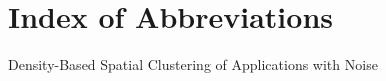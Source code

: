 
\chapter*{Index of Abbreviations}

\begin{acronym}[Bash]
  {Density-Based Spatial Clustering of Applications with Noise}
\end{acronym}